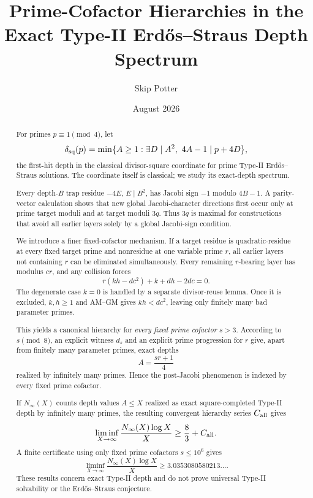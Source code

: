 \documentclass[11pt]{article}
\title{Prime-Cofactor Hierarchies in the Exact Type-II Erd\H{o}s--Straus Depth Spectrum}
\author{Skip Potter}
\date{August 2026}
\theoremstyle{definition}
\newcommand{\sqdepth}{\delta_{\rm sq}}
\begin{document}
\maketitle

\begin{abstract}
For primes $p\equiv1\pmod4$, let
\[
\sqdepth(p)=\min\{A\ge1:\exists D\mid A^2,\ 4A-1\mid p+4D\},
\]
the first-hit depth in the classical divisor-square coordinate for prime Type-II Erd\H{o}s--Straus solutions. The coordinate itself is classical; we study its exact-depth spectrum.

Every depth-$B$ trap residue $-4E$, $E\mid B^2$, has Jacobi sign $-1$ modulo $4B-1$. A parity-vector calculation shows that new global Jacobi-character directions first occur only at prime target moduli and at target moduli $3q$. Thus $3q$ is maximal for constructions that avoid all earlier layers solely by a global Jacobi-sign condition.

We introduce a finer fixed-cofactor mechanism. If a target residue is quadratic-residue at every fixed target prime and nonresidue at one variable prime $r$, all earlier layers not containing $r$ can be eliminated simultaneously. Every remaining $r$-bearing layer has modulus $cr$, and any collision forces
\[
\boxed{r(kh-dc^2)+k+dh-2dc=0.}
\]
The degenerate case $k=0$ is handled by a separate divisor-reuse lemma. Once it is excluded, $k,h\ge1$ and AM--GM gives $kh<dc^2$, leaving only finitely many bad parameter primes.

This yields a canonical hierarchy for \emph{every fixed prime cofactor $s>3$}. According to $s\pmod8$, an explicit witness $d_s$ and an explicit prime progression for $r$ give, apart from finitely many parameter primes, exact depths
\[
A=\frac{sr+1}{4}
\]
realized by infinitely many primes. Hence the post-Jacobi phenomenon is indexed by every fixed prime cofactor.

If $N_\infty(X)$ counts depth values $A\le X$ realized as exact square-completed Type-II depth by infinitely many primes, the resulting convergent hierarchy series $C_{\rm all}$ gives
\[
\liminf_{X\to\infty}\frac{N_\infty(X)\log X}{X}\ge\frac83+C_{\rm all}.
\]
A finite certificate using only fixed prime cofactors $s\le10^6$ gives
\[
\boxed{
\liminf_{X\to\infty}\frac{N_\infty(X)\log X}{X}
\ge3.0353080580213\ldots .
}
\]
These results concern exact Type-II depth and do not prove universal Type-II solvability or the Erd\H{o}s--Straus conjecture.
\end{abstract}
\end{document}
